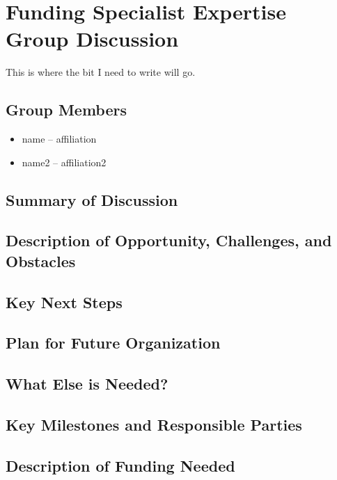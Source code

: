 \section{Funding Specialist Expertise Group Discussion}
\label{sec:appendix_funding_spec_expert}


This is where the bit I need to write will go.

\subsection{Group Members}

\begin{itemize}
\item name -- affiliation
\item name2 -- affiliation2
\end{itemize}

\subsection{Summary of Discussion}

\subsection{Description of Opportunity, Challenges, and Obstacles}


\subsection{Key Next Steps}


\subsection{Plan for Future Organization}


\subsection{What Else is Needed?}


\subsection{Key Milestones and Responsible Parties}


\subsection{Description of Funding Needed}

